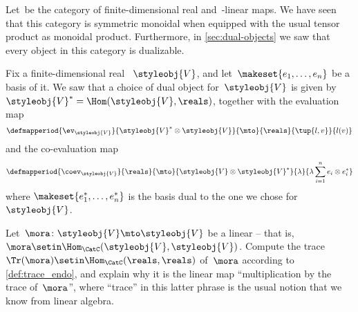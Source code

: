 \begin{gradedexercise}
    \label{ex:LinearAlgebraTrace}
    Let~\CatC be the category of finite-dimensional real  and~\reals-linear maps.
    We have seen that this category is symmetric monoidal when equipped with the usual tensor product as monoidal product.
    Furthermore, in \cref{sec:dual-objects} we saw that every object in this category is dualizable.

    Fix a finite-dimensional real ~$\styleobj{V}$, and let~$\makeset{e_1,\ldots,e_n }$ be a basis of it.
    We saw that a choice of dual object for~$\styleobj{V}$ is given by~$\styleobj{V}^* = \Hom(\styleobj{V}, \reals)$, together with the evaluation map
    \begin{equation}
        \defmapperiod{
            \ev_\styleobj{V}
        }{
            \styleobj{V}^* \otimes \styleobj{V}
        }{
            \mto
        }{
            \reals
        }{
            \tup{l, v}
        }{
            l(v)
        }
    \end{equation}
    and the co-evaluation map
    \begin{equation}
        \defmapperiod{
            \coev_\styleobj{V}
        }{
            \reals
        }{
            \mto
        }{
            \styleobj{V} \otimes \styleobj{V}^*
        }{
            \lambda
        }{
            \lambda \sum_{i=1}^n e_i \otimes e_i^*
        }
    \end{equation}
    where $\makeset{e_1^*,\ldots,e_n^* }$ is the basis dual to the one we chose for~$\styleobj{V}$.

    Let~$\mora\colon \styleobj{V} \mto \styleobj{V}$ be a linear  -- that is,~$\mora \setin \Hom_{\CatC}(\styleobj{V}, \styleobj{V})$.
    Compute the trace~$\Tr(\mora) \setin \Hom_{\CatC}(\reals, \reals)$ of~$\mora$ according to \cref{def:trace_endo}, and explain why it is the linear map ``multiplication by the trace of~$\mora$'', where ``trace'' in this latter phrase is the usual notion that we know from linear algebra.
\end{gradedexercise}

